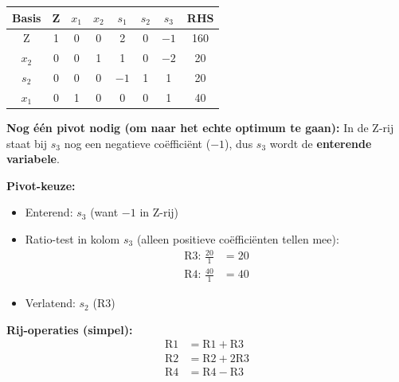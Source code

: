 \documentclass[a4paper,11pt]{article}
\begin{document}
\begin{oefenblok}
    \begin{center}
        \begin{tabular}{|c|c|c|c|c|c|c|c|}
            \hline
            \textbf{Basis} & \textbf{Z} & \textbf{$x_1$} & \textbf{$x_2$} & \textbf{$s_1$} & \textbf{$s_2$} & \textbf{$s_3$} & \textbf{RHS} \\
            \hline
            Z              & 1          & 0              & 0              & 2              & 0              & $-1$           & 160          \\
            \hline
            $x_2$          & 0          & 0              & 1              & 1              & 0              & $-2$           & 20           \\
            \hline
            $s_2$          & 0          & 0              & 0              & $-1$           & 1              & 1              & 20           \\
            \hline
            $x_1$          & 0          & 1              & 0              & 0              & 0              & 1              & 40           \\
            \hline
        \end{tabular}
    \end{center}
    \FloatBarrier

    \textbf{Nog één pivot nodig (om naar het echte optimum te gaan):}
    In de Z-rij staat bij $s_3$ nog een negatieve coëfficiënt ($-1$), dus $s_3$ wordt de \textbf{enterende variabele}.

    \textbf{Pivot-keuze:}
    \begin{itemize}
        \item Enterend: $s_3$ (want $-1$ in Z-rij)
        \item Ratio-test in kolom $s_3$ (alleen positieve coëfficiënten tellen mee):
              \begin{align*}
                  \text{R3: } \frac{20}{1} & = 20 \\
                  \text{R4: } \frac{40}{1} & = 40
              \end{align*}
        \item Verlatend: $s_{2}$ (R3)
    \end{itemize}

    \textbf{Rij-operaties (simpel):}
    \begin{align*}
        \text{R1} & = \text{R1} + \text{R3}  \\
        \text{R2} & = \text{R2} + 2\text{R3} \\
        \text{R4} & = \text{R4} - \text{R3}
    \end{align*}


\end{oefenblok}
\end{document}
